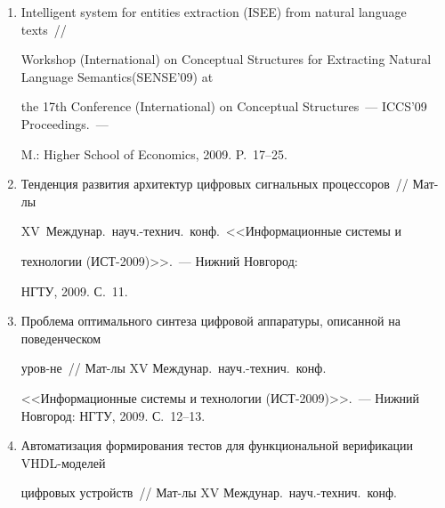 \begin{enumerate}[1.]
Информационное агентство <<ГРОМ>>, 2009. С.~35--38.





\item {}


Intelligent system for entities extraction (ISEE) from natural language texts~//  


Workshop (International) on Conceptual Structures for Extracting Natural Language Semantics\linebreak (SENSE'09) at 


the 17th  Conference (International) on Conceptual Structures~--- ICCS'09 Proceedings.~--- 


M.: Higher School of Economics, 2009. P.~17--25.





\item {}


Тенденция развития архитектур цифровых сигнальных процессоров~// Мат-лы 


XV~Междунар.\ науч.-технич.\ конф.\ <<Информационные сис\-те\-мы и 


технологии (ИСТ-2009)>>.~--- Нижний Новгород: 


НГТУ, 2009. С.~11.





\item {}


Проблема оптимального синтеза цифровой аппаратуры, описанной на поведенческом 


уров-\linebreak не~// Мат-лы XV Междунар.\  науч.-технич.\ конф.\ 


<<Информационные системы и технологии (ИСТ-2009)>>.~--- Нижний Новгород: НГТУ, 2009. С.~12--13.





\item {}


Автоматизация формирования тестов для функциональной верификации VHDL-моделей\linebreak 


циф\-ро\-вых устройств~// Мат-лы XV Междунар.\ науч.-тех\-нич.\ конф.\



\end{enumerate}
